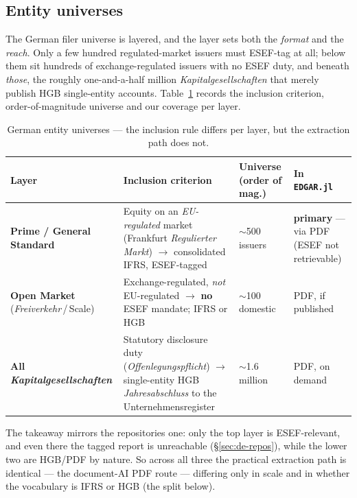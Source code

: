 \documentclass[11pt,a4paper]{report}
\begin{document}
\subsection{Entity universes}\label{sec:de-entities}

The German filer universe is layered, and the layer sets both the \emph{format} and the \emph{reach}. Only a
few hundred regulated-market issuers must ESEF-tag at all; below them sit hundreds of exchange-regulated
issuers with no ESEF duty, and beneath \emph{those}, the roughly one-and-a-half million
\emph{Kapitalgesellschaften} that merely publish HGB single-entity accounts. Table~\ref{tab:de-entities}
records the inclusion criterion, order-of-magnitude universe and our coverage per layer.

\begin{table}[h]
\centering
\small
\caption{German entity universes --- the inclusion rule differs per layer, but the extraction path does not.}
\label{tab:de-entities}
\begin{tabular}{@{}p{}p{}p{}p{}@{}}
\toprule
\textbf{Layer} & \textbf{Inclusion criterion} & \textbf{Universe (order of mag.)} & \textbf{In \texttt{EDGAR.jl}} \\
\midrule
\textbf{Prime / General Standard} & Equity on an \emph{EU-regulated} market (Frankfurt \emph{Regulierter Markt}) $\to$ consolidated IFRS, ESEF-tagged & $\sim$500 issuers & \textbf{primary} --- via PDF (ESEF not retrievable) \\
\textbf{Open Market} (\emph{Freiverkehr}\,/\,Scale) & Exchange-regulated, \emph{not} EU-regulated $\to$ \textbf{no} ESEF mandate; IFRS or HGB & $\sim$100 domestic & PDF, if published \\
\textbf{All \emph{Kapitalgesellschaften}} & Statutory disclosure duty (\emph{Offenlegungspflicht}) $\to$ single-entity HGB \emph{Jahresabschluss} to the Unternehmensregister & $\sim$1.6\,million & PDF, on demand \\
\bottomrule
\end{tabular}
\end{table}

\noindent The takeaway mirrors the repositories one: only the top layer is ESEF-relevant, and even there the
tagged report is unreachable (\S\ref{sec:de-repos}), while the lower two are HGB/PDF by nature. So across all
three the practical extraction path is identical --- the document-AI PDF route --- differing only in scale and
in whether the vocabulary is IFRS or HGB (the split below).
\end{document}
